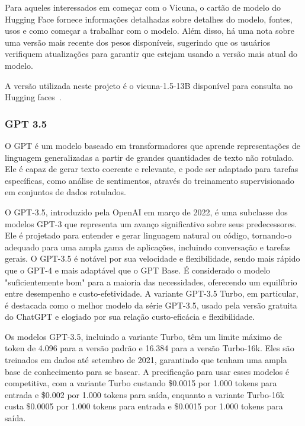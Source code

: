 Para aqueles interessados em começar com o Vicuna, o cartão de modelo do Hugging Face fornece informações detalhadas sobre detalhes do modelo, fontes, usos e como começar a trabalhar com o modelo. Além disso, há uma nota sobre uma versão mais recente dos pesos disponíveis, sugerindo que os usuários verifiquem atualizações para garantir que estejam usando a versão mais atual do modelo.

A versão utilizada neste projeto é o vicuna-1.5-13B disponível para consulta no Hugging faces~.

\subsubsection{GPT 3.5}
\label{cap:fund_teorica:sec:modelos:subsec:gpt}

O GPT é um modelo baseado em transformadores que aprende representações de linguagem generalizadas a partir de grandes quantidades de texto não rotulado. Ele é capaz de gerar texto coerente e relevante, e pode ser adaptado para tarefas específicas, como análise de sentimentos, através do treinamento supervisionado em conjuntos de dados rotulados.

O GPT-3.5, introduzido pela OpenAI em março de 2022, é uma subclasse dos modelos GPT-3 que representa um avanço significativo sobre seus predecessores. Ele é projetado para entender e gerar linguagem natural ou código, tornando-o adequado para uma ampla gama de aplicações, incluindo conversação e tarefas gerais. O GPT-3.5 é notável por sua velocidade e flexibilidade, sendo mais rápido que o GPT-4 e mais adaptável que o GPT Base. É considerado o modelo "suficientemente bom" para a maioria das necessidades, oferecendo um equilíbrio entre desempenho e custo-efetividade. A variante GPT-3.5 Turbo, em particular, é destacada como o melhor modelo da série GPT-3.5, usado pela versão gratuita do ChatGPT e elogiado por sua relação custo-eficácia e flexibilidade.

Os modelos GPT-3.5, incluindo a variante Turbo, têm um limite máximo de token de 4.096 para a versão padrão e 16.384 para a versão Turbo-16k. Eles são treinados em dados até setembro de 2021, garantindo que tenham uma ampla base de conhecimento para se basear. A precificação para usar esses modelos é competitiva, com a variante Turbo custando \$0.0015 por 1.000 tokens para entrada e \$0.002 por 1.000 tokens para saída, enquanto a variante Turbo-16k custa \$0.0005 por 1.000 tokens para entrada e \$0.0015 por 1.000 tokens para saída.

